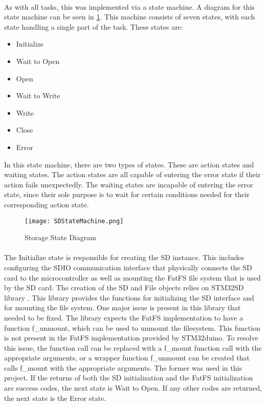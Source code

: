 \paragraph{}
As with all tasks, this was implemented via a state machine.
A diagram for this state machine can be seen in \cref{fig:StorageDiagram}.
This machine consists of seven states, with each state handling a single part of the task.
These states are:
\begin{itemize}
	\item Initialize
	\item Wait to Open
	\item Open
	\item Wait to Write
	\item Write
	\item Close
	\item Error
\end{itemize}
In this state machine, there are two types of states.
These are action states and waiting states.
The action states are all capable of entering the error state if their action fails unexpectedly.
The waiting states are incapable of entering the error state, since their sole purpose is to wait for certain conditions needed for their corresponding action state.

\begin{figure}[H]
	\centering
	\texttt{[image: SDStateMachine.png]}
	\caption{Storage State Diagram}
	\label{fig:StorageDiagram}
\end{figure}

\paragraph{}
The Initialize state is responsible for creating the SD instance.
This includes configuring the SDIO communication interface that physically connects the SD card to the microcontroller as well as mounting the FatFS file system that is used by the SD card.
The creation of the SD and File objects relies on STM32SD library \cite{STM32SDGithub}.
This library provides the functions for initializing the SD interface and for mounting the file system.
One major issue is present in this library that needed to be fixed.
The library expects the FatFS implementation to have a function f\_unmount, which can be used to unmount the filesystem.
This function is not present in the FatFS implementation provided by STM32duino.
To resolve this issue, the function call can be replaced with a f\_mount function call with the appropriate arguments, or a wrapper function f\_unmount can be created that calls f\_mount with the appropriate arguments.
The former was used in this project.
If the returns of both the SD initialization and the FatFS initialization are success codes, the next state is Wait to Open.
If any other codes are returned, the next state is the Error state.

